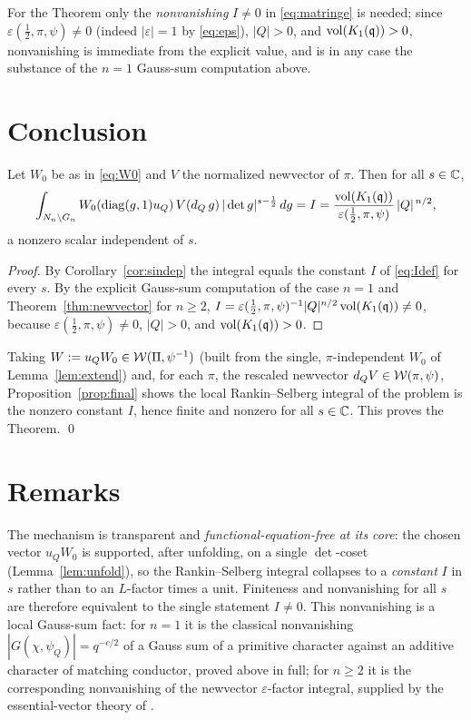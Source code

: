 \medskip
\noindent For the Theorem only the \emph{nonvanishing} $I\neq0$ in \eqref{eq:matringe} is needed;
since $\varepsilon(\tfrac12,\pi,\psi)\neq0$ \textup{(}indeed $|\varepsilon|=1$ by
\eqref{eq:eps}\textup{)}, $|Q|>0$, and $\operatorname{vol}(K_1(\mathfrak{q}))>0$, nonvanishing is immediate from
the explicit value, and is in any case the substance of the $n=1$ Gauss-sum computation above.

\section*{Conclusion}

\begin{qtwoproposition}\label{prop:final}
Let $W_0$ be as in \eqref{eq:W0} and $V$ the normalized newvector of $\pi$. Then for all
$s\in\mathbb{C}$,
\[
\int_{N_n\backslash G_n} W_0(\operatorname{diag}(g,1)u_Q)\,V(d_Q\,g)\,|\det g|^{s-\frac12}\,dg
= I
=\frac{\operatorname{vol}(K_1(\mathfrak{q}))}{\varepsilon(\tfrac12,\pi,\psi)}\,|Q|^{\,n/2},
\]
a nonzero scalar independent of $s$.
\end{qtwoproposition}

\begin{proof}
By Corollary~\ref{cor:sindep} the integral equals the constant $I$ of \eqref{eq:Idef} for every
$s$. By the explicit Gauss-sum computation of the case $n=1$ and Theorem~\ref{thm:newvector} for
$n\ge2$, $I=\varepsilon(\tfrac12,\pi,\psi)^{-1}|Q|^{n/2}\operatorname{vol}(K_1(\mathfrak{q}))\neq0$, because
$\varepsilon(\tfrac12,\pi,\psi)\neq0$, $|Q|>0$, and $\operatorname{vol}(K_1(\mathfrak{q}))>0$.
\end{proof}

Taking $W:=u_Q W_0\in\mathcal{W}(\Pi,\psi^{-1})$ \textup{(}built from the single, $\pi$-independent
$W_0$ of Lemma~\ref{lem:extend}\textup{)} and, for each $\pi$, the rescaled newvector $d_Q V\in
\mathcal{W}(\pi,\psi)$, Proposition~\ref{prop:final} shows the local Rankin--Selberg integral of the
problem is the nonzero constant $I$, hence finite and nonzero for all $s\in\mathbb{C}$. This proves
the Theorem. \qed

\section*{Remarks}

The mechanism is transparent and \emph{functional-equation-free at its core}: the chosen vector
$u_Q W_0$ is supported, after unfolding, on a single $\det$-coset
\textup{(}Lemma~\ref{lem:unfold}\textup{)}, so the Rankin--Selberg integral collapses to a
\emph{constant} $I$ in $s$ rather than to an $L$-factor times a unit. Finiteness and nonvanishing
for all $s$ are therefore equivalent to the single statement $I\neq0$. This nonvanishing is a
local Gauss-sum fact: for $n=1$ it is the classical nonvanishing $|G(\chi,\psi_Q)|=q^{-c/2}$ of a
Gauss sum of a primitive character against an additive character of matching conductor, proved
above in full; for $n\ge2$ it is the corresponding nonvanishing of the newvector
$\varepsilon$-factor integral, supplied by the essential-vector theory of \cite{JPSS81,Matringe}.


